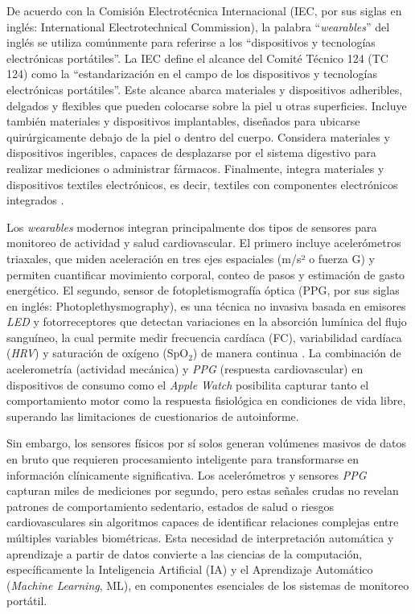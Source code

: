 De acuerdo con la Comisión Electrotécnica Internacional (IEC, por sus siglas en inglés: International Electrotechnical Commission), la palabra ``\textit{wearables}'' del inglés se utiliza comúnmente para referirse a los ``dispositivos y tecnologías electrónicas portátiles''. La IEC define el alcance del Comité Técnico 124 (TC 124) como la ``estandarización en el campo de los dispositivos y tecnologías electrónicas portátiles''. Este alcance abarca materiales y dispositivos adheribles, delgados y flexibles que pueden colocarse sobre la piel u otras superficies. Incluye también materiales y dispositivos implantables, diseñados para ubicarse quirúrgicamente debajo de la piel o dentro del cuerpo. Considera materiales y dispositivos ingeribles, capaces de desplazarse por el sistema digestivo para realizar mediciones o administrar fármacos. Finalmente, integra materiales y dispositivos textiles electrónicos, es decir, textiles con componentes electrónicos integrados \cite{IEC2019Wearables}.

Los \textit{wearables} modernos integran principalmente dos tipos de sensores para monitoreo de actividad y salud cardiovascular. El primero incluye acelerómetros triaxales, que miden aceleración en tres ejes espaciales (m/s² o fuerza G) y permiten cuantificar movimiento corporal, conteo de pasos y estimación de gasto energético. El segundo, sensor de fotopletismografía óptica (PPG, por sus siglas en inglés: Photoplethysmography), es una técnica no invasiva basada en emisores \textit{LED} y fotorreceptores que detectan variaciones en la absorción lumínica del flujo sanguíneo, la cual permite medir frecuencia cardíaca (FC), variabilidad cardíaca (\textit{HRV}) y saturación de oxígeno (SpO$_2$) de manera continua \cite{Bent2020,Shcherbina2017,Henriksen2018,White2019}. La combinación de acelerometría (actividad mecánica) y \textit{PPG} (respuesta cardiovascular) en dispositivos de consumo como el \textit{Apple Watch} posibilita capturar tanto el comportamiento motor como la respuesta fisiológica en condiciones de vida libre, superando las limitaciones de cuestionarios de autoinforme.

Sin embargo, los sensores físicos por sí solos generan volúmenes masivos de datos en bruto que requieren procesamiento inteligente para transformarse en información clínicamente significativa. Los acelerómetros y sensores \textit{PPG} capturan miles de mediciones por segundo, pero estas señales crudas no revelan patrones de comportamiento sedentario, estados de salud o riesgos cardiovasculares sin algoritmos capaces de identificar relaciones complejas entre múltiples variables biométricas. Esta necesidad de interpretación automática y aprendizaje a partir de datos convierte a las ciencias de la computación, específicamente la Inteligencia Artificial (IA) y el Aprendizaje Automático (\textit{Machine Learning}, ML), en componentes esenciales de los sistemas de monitoreo portátil.

